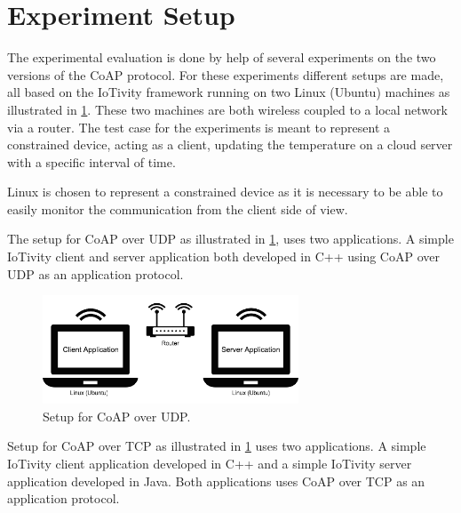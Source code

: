 \section{Experiment Setup}\label{sec:experimentsetup}
The experimental evaluation is done by help of several experiments on the two versions of the CoAP protocol. For these experiments different setups are made, all based on the IoTivity framework running on two Linux (Ubuntu) machines as illustrated in \figurename \ref{fig:setup}. These two machines are both wireless coupled to a local network via a router. The test case for the experiments is meant to represent a constrained device, acting as a client, updating the temperature on a cloud server with a specific interval of time. 

Linux is chosen to represent a constrained device as it is necessary to be able to easily monitor the communication from the client side of view.

The setup for CoAP over UDP as illustrated in \figurename \ref{fig:setup}, uses two applications. A simple IoTivity client and server application both developed in C++ using CoAP over UDP as an application protocol.
\begin{figure}[bht]
	\centering
	\includegraphics[width=3in]{gfx/setupa}
	\caption{Setup for CoAP over UDP.}
	\label{fig:setup}
\end{figure}

Setup for CoAP over TCP as illustrated in \figurename \ref{fig:setup} uses two applications. A simple IoTivity client application developed in C++ and a simple IoTivity server application developed in Java. Both applications uses CoAP over TCP as an application protocol.


